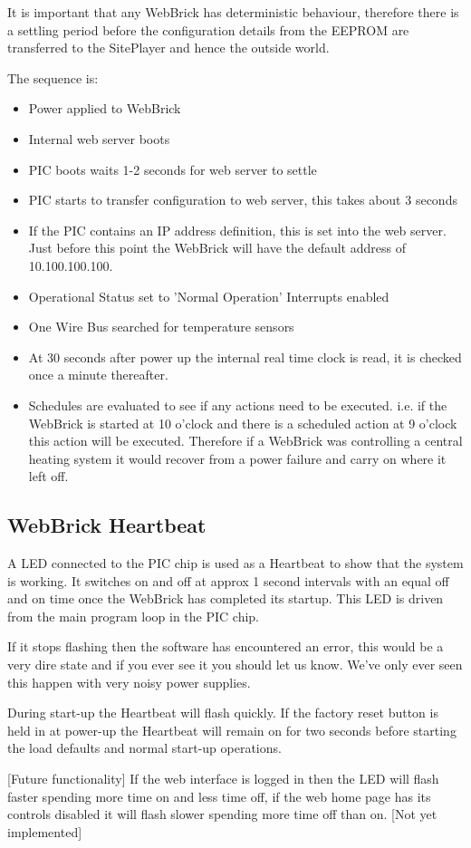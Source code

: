 It is important that any WebBrick has deterministic behaviour, therefore there is a settling period
before the configuration details from the EEPROM are transferred to the SitePlayer and hence the outside world.

The sequence is:

\begin{itemize}
	\item Power applied to WebBrick
	\item Internal web server  boots
	\item PIC boots waits 1-2 seconds for web server to settle
	\item PIC starts to transfer configuration to web server, this takes about 3 seconds
	\item If the PIC contains an IP address definition, this is set into the web server.  
        	Just before this point the WebBrick will have the 
		default address of 10.100.100.100.
	\item Operational Status set to 'Normal Operation' Interrupts enabled
	\item One Wire Bus searched for temperature sensors
	\item At 30 seconds after power up the internal real time clock is read, it is checked once a minute thereafter.
	\item Schedules are evaluated to see if any actions need to be executed.  i.e. 
		if the WebBrick is started at 10 o'clock and there is a scheduled action at 9 o'clock 
		this action will be executed.  Therefore if a WebBrick was controlling a central heating
		system it would recover from a power failure and carry on where it left off.
\end{itemize}

\subsection{WebBrick Heartbeat}

A LED connected to the PIC chip is used as a Heartbeat to show that the system is working.
It switches on and off at approx 1 second intervals with an equal off and on time once the 
WebBrick has completed its startup.
This LED is driven from the main program loop in the PIC chip.

If it stops flashing then the software has encountered an error, this would be a very dire state and if you ever see it
you should let us know.  We've only ever seen this happen with very noisy power supplies. 

During start-up the Heartbeat will flash quickly.  If the factory reset  button is held in
at power-up the Heartbeat will remain on for two seconds before starting the load defaults and normal start-up operations.

[Future functionality] If the web interface is logged in then the LED will flash 
faster spending more time on and less time off, if the web home page has its controls disabled it will flash
slower spending more time off than on. [Not yet implemented]

